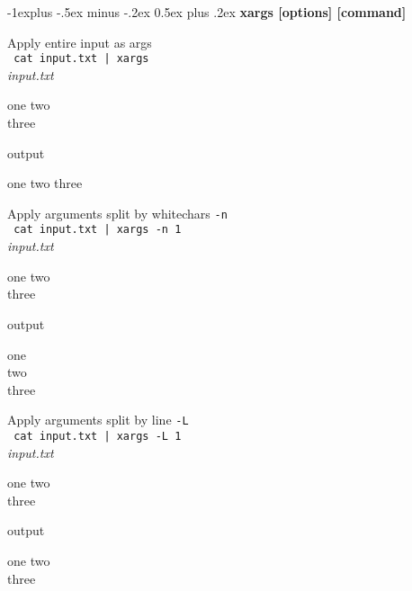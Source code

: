 \documentclass[8pt,landscape]{article}
\makeatletter
\renewcommand{\subsection}{\@startsection{subsection}{2}{0mm}%
                                {-1explus -.5ex minus -.2ex}%
                                {0.5ex plus .2ex}%
                                {\normalfont\normalsize\bfseries}}
\makeatother
\begin{document}
\begin{multicols}{3}
\vspace{0.2cm}
\subsection{\textbf{xargs [options] [command]}}
\vspace{0.2cm}

Apply entire input as args \\
\texttt{
cat input.txt | xargs
} \\
\vspace{0.2cm}
\textit{input.txt} \begin{tcolorbox}[enhanced jigsaw,colback=bg,boxrule=0pt,arc=0pt]
one two \\
three
\end{tcolorbox}
output \begin{tcolorbox}[enhanced jigsaw,colback=bg,boxrule=0pt,arc=0pt]
one two three
\end{tcolorbox}
\vspace{0.2cm}

Apply arguments split by whitechars \texttt{-n} \\
\texttt{
cat input.txt | xargs -n 1
} \\
\vspace{0.2cm}
\textit{input.txt} \begin{tcolorbox}[enhanced jigsaw,colback=bg,boxrule=0pt,arc=0pt]
one two \\
three
\end{tcolorbox}
output \begin{tcolorbox}[enhanced jigsaw,colback=bg,boxrule=0pt,arc=0pt]
one \\ two \\ three
\end{tcolorbox}

Apply arguments split by line \texttt{-L} \\
\texttt{
cat input.txt | xargs -L 1
} \\
\vspace{0.2cm}
\textit{input.txt} \begin{tcolorbox}[enhanced jigsaw,colback=bg,boxrule=0pt,arc=0pt]
one two \\ three
\end{tcolorbox}
output \begin{tcolorbox}[enhanced jigsaw,colback=bg,boxrule=0pt,arc=0pt]
one two \\ three
\end{tcolorbox}

\vspace*{\fill}
\columnbreak



\end{multicols}
\end{document}
